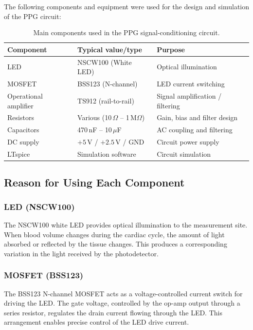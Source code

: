 \documentclass[10pt]{article}
\begin{document}
The following components and equipment were used for the design and simulation of the PPG circuit:

\begin{table}[H]
\centering
\caption{Main components used in the PPG signal-conditioning circuit.}
\begin{tabular}{lll}
\toprule
Component & Typical value/type & Purpose\\
\midrule
LED & NSCW100 (White LED) & Optical illumination\\
MOSFET & BSS123 (N-channel) & LED current switching\\
Operational amplifier & TS912 (rail-to-rail) & Signal amplification / filtering\\
Resistors & Various (10\,$\Omega$ -- 1\,M$\Omega$) & Gain, bias and filter design\\
Capacitors & 470\,nF -- 10\,$\mu$F & AC coupling and filtering\\
DC supply & $+5$\,V / $+2.5$\,V / GND & Circuit power supply\\
LTspice & Simulation software & Circuit simulation\\
\bottomrule
\end{tabular}
\end{table}

\subsection{Reason for Using Each Component}

\subsubsection{LED (NSCW100)}

The NSCW100 white LED provides optical illumination to the measurement site. When blood volume changes during the cardiac cycle, the amount of light absorbed or reflected by the tissue changes. This produces a corresponding variation in the light received by the photodetector.

\subsubsection{MOSFET (BSS123)}

The BSS123 N-channel MOSFET acts as a voltage-controlled current switch for driving the LED. The gate voltage, controlled by the op-amp output through a series resistor, regulates the drain current flowing through the LED. This arrangement enables precise control of the LED drive current.
\end{document}
